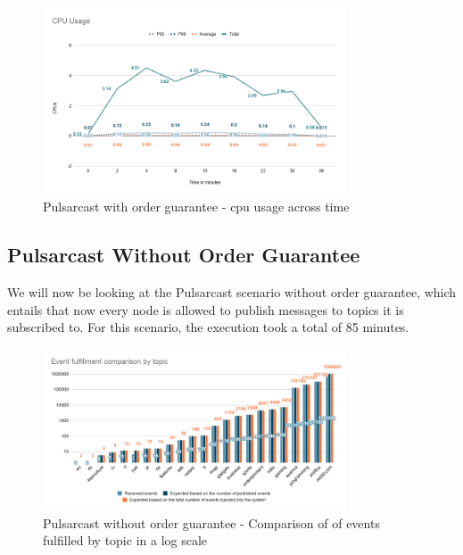 \begin{figure}[!htb]
  \centering
  \includegraphics[width=0.8\textwidth]{img/graph-pulsarcast-order-cpu.png}
  \caption{Pulsarcast with order guarantee - \acrshort{cpu} usage across time}
  \label{fig:graph-pulsarcast-order-cpu}
\end{figure}

\subsection{Pulsarcast Without Order Guarantee}\label{subsec:pulsarcast-without-order-guarantee}

We will now be looking at the Pulsarcast scenario without order guarantee,
which entails that now every node is allowed to publish messages to topics it
is subscribed to. For this scenario, the execution took a total of 85 minutes.

\begin{figure}[!htb]
  \centering
  \includegraphics[width=0.8\textwidth]{img/graph-pulsarcast-event-fulfillment-comparison.png}
  \caption{Pulsarcast without order guarantee - Comparison of of events fulfilled by topic in a log scale}
  \label{fig:graph-pulsarcast-event-fulfillment-comparison}
\end{figure}

